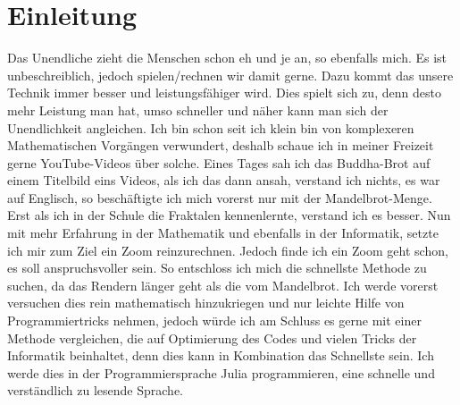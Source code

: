 \section{Einleitung}
Das Unendliche zieht die Menschen schon eh und je an, so ebenfalls mich. Es ist unbeschreiblich, jedoch spielen/rechnen wir damit gerne. Dazu kommt das unsere Technik immer besser und leistungsfähiger wird. Dies spielt sich zu, denn desto mehr Leistung man hat, umso schneller und näher kann man sich der Unendlichkeit angleichen. Ich bin schon seit ich klein bin von komplexeren Mathematischen Vorgängen verwundert, deshalb schaue ich in meiner Freizeit gerne YouTube-Videos über solche. Eines Tages sah ich das Buddha-Brot auf einem Titelbild eins Videos, als ich das dann ansah, verstand ich nichts, es war auf Englisch, so beschäftigte ich mich vorerst nur mit der Mandelbrot-Menge. Erst als ich in der Schule die Fraktalen kennenlernte, verstand ich es besser. Nun mit mehr Erfahrung in der Mathematik und ebenfalls in der Informatik, setzte ich mir zum Ziel ein Zoom reinzurechnen. Jedoch finde ich ein Zoom geht schon, es soll anspruchsvoller sein. So entschloss ich mich die schnellste Methode zu suchen, da das Rendern länger geht als die vom Mandelbrot. Ich werde vorerst versuchen dies rein mathematisch hinzukriegen und nur leichte Hilfe von Programmiertricks nehmen, jedoch würde ich am Schluss es gerne mit einer Methode vergleichen, die auf Optimierung des Codes und vielen Tricks der Informatik beinhaltet, denn dies kann in Kombination das Schnellste sein. Ich werde dies in der Programmiersprache Julia programmieren, eine schnelle und verständlich zu lesende Sprache.
